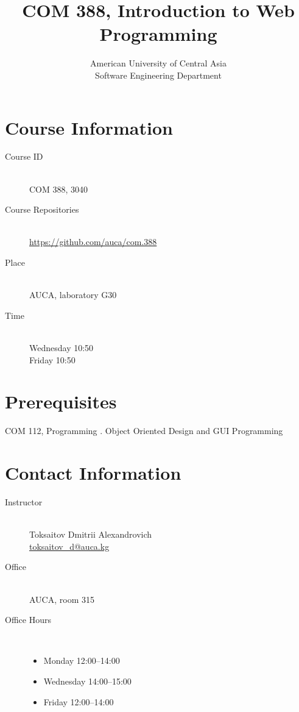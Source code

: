 \documentclass[12pt,a4paper,oneside]{article}
\newcommand{\R}[1]{\uppercase\expandafter{\romannumeral #1\relax}}
\begin{document}
    \title{COM 388, Introduction to Web Programming}
    \author{
        American University of Central Asia\\
        Software Engineering Department
    }
    \date{}
    \maketitle

    \section{Course Information}

        \begin{description}
            \item[Course ID]\hfill\\
                COM 388, 3040
            \item[Course Repositories]\hfill\\
                \url{https://github.com/auca/com.388}
            \item[Place]\hfill\\
                AUCA, laboratory G30
            \item[Time]\hfill\\
                Wednesday 10:50\\
                Friday 10:50
        \end{description}

    \section{Prerequisites}

        COM 112, Programming \R{2}. Object Oriented Design and GUI Programming

        \section{Contact Information}

            \begin{description}
                \item[Instructor]\hfill\\
                    Toksaitov Dmitrii Alexandrovich\\
                    \href{mailto:toksaitov_d@auca.kg}{toksaitov\_d@auca.kg}
                \item[Office]\hfill\\
                    AUCA, room 315
                \item[Office Hours]\hfill\\
                    \begin{itemize}
                        \item Monday 12:00--14:00
                        \item Wednesday 14:00--15:00
                        \item Friday 12:00--14:00
                    \end{itemize}
            \end{description}
\end{document}
